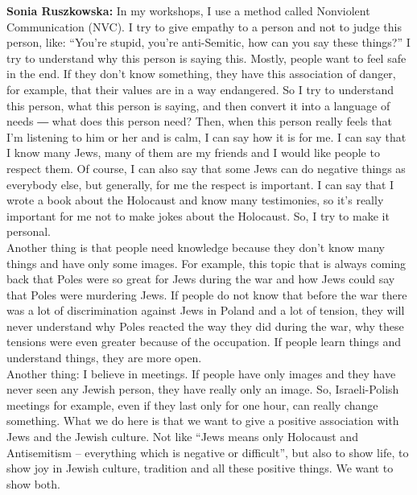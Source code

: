\textbf{Sonia Ruszkowska:} In my workshops, I use a method called Nonviolent Communication (NVC). I try to give empathy to a person and not to judge this person, like: ``You’re stupid, you’re anti-Semitic, how can you say these things?'' I try to understand why this person is saying this. Mostly, people want to feel safe in the end. If they don’t know something, they have this association of danger, for example, that their values are in a way endangered. So I try to understand this person, what this person is saying, and then convert it into a language of needs ― what does this person need? Then, when this person really feels that I’m listening to him or her and is calm, I can say how it is for me. I can say that I know many Jews, many of them are my friends and I would like people to respect them. Of course, I can also say that some Jews can do negative things as everybody else, but generally, for me the respect is important. I can say that I wrote a book about the Holocaust and know many testimonies, so it’s really important for me not to make jokes about the Holocaust. So, I try to make it personal.\\ 
Another thing is that people need knowledge because they don’t know many things and have only some images. For example, this topic that is always coming back that Poles were so great for Jews during the war and how Jews could say that Poles were murdering Jews. If people do not know that before the war there was a lot of discrimination against Jews in Poland and a lot of tension, they will never understand why Poles reacted the way they did during the war, why these tensions were even greater because of the occupation. If people learn things and understand things, they are more open.\\  
Another thing: I believe in meetings. If people have only images and they have never seen any Jewish person, they have really only an image. So, Israeli-Polish meetings for example, even if they last only for one hour, can really change something. What we do here is that we want to give a positive association with Jews and the Jewish culture. Not like ``Jews means only Holocaust and Antisemitism – everything which is negative or difficult'', but also to show life, to show joy in Jewish culture, tradition and all these positive things. We want to show both. 


